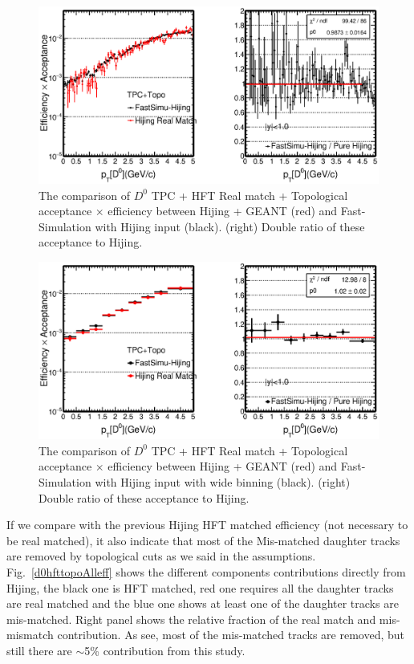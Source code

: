 \begin{figure}[htbp]
\centering
\includegraphics[keepaspectratio,width=1.0\textwidth,angle=0]{figure/Run14_D0HFT/Real_Physics_FastHijingVsPureHijing_HFTTopo2.eps}
\caption{The comparison of $D^0$ TPC + HFT Real match + Topological acceptance $\times$ efficiency between Hijing + GEANT (red) and Fast-Simulation with Hijing input (black). (right) Double ratio of these acceptance to Hijing.}
\label{d0hfttoporealeff}
\end{figure}

\begin{figure}[htbp]
\centering
\includegraphics[keepaspectratio,width=1.0\textwidth,angle=0]{figure/Run14_D0HFT/Real_Physics_FastHijingVsPureHijing_HFTTopo.eps}
\caption{The comparison of $D^0$ TPC + HFT Real match + Topological acceptance $\times$ efficiency between Hijing + GEANT (red) and Fast-Simulation with Hijing input with wide binning (black). (right) Double ratio of these acceptance to Hijing.}
\label{d0hfttoporealeff2}
\end{figure}

If we compare with the previous Hijing HFT matched efficiency (not necessary to be real matched), it also indicate that most of the Mis-matched daughter tracks are removed by topological cuts as we said in the assumptions. Fig.~\ref{d0hfttopoAlleff} shows the different components contributions directly from Hijing, the black one is HFT matched, red one requires all the daughter tracks are real matched and the blue one shows at least one of the daughter tracks are mis-matched. Right panel shows the relative fraction of the real match and mis-mismatch contribution. As see, most of the mis-matched tracks are removed, but still there are $\sim$5\% contribution from this study.

